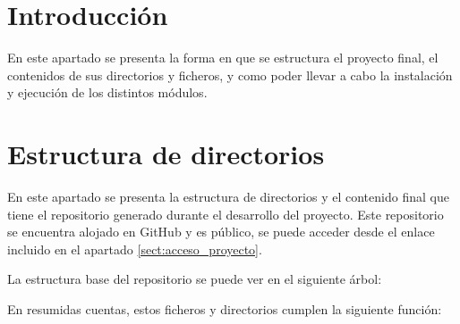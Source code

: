 
\section{Introducción}

En este apartado se presenta la forma en que se estructura el proyecto final, el contenidos de sus directorios y ficheros, y como poder llevar a cabo la instalación y ejecución de los distintos módulos.


\section{Estructura de directorios}

En este apartado se presenta la estructura de directorios y el contenido final que tiene el repositorio generado durante el desarrollo del proyecto. Este repositorio se encuentra alojado en GitHub y es público, se puede acceder desde el enlace incluido en el apartado \ref{sect:acceso_proyecto}.

La estructura base del repositorio se puede ver en el siguiente árbol:
    
\begin{figure}[H]
    \centering
    \begin{minipage}{7cm}
    \end{minipage}
\end{figure}

En resumidas cuentas, estos ficheros y directorios cumplen la siguiente función:

